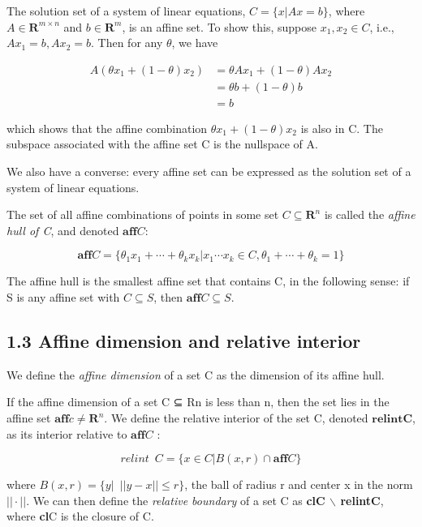 \documentclass{article}
\begin{document}
The solution set of a system of linear
equations, $C=\{x|Ax=b\}$, where $A\in \mathbf{R}^{m\times n}$ and $b \in\mathbf{R}^m$, is an affine set. To
show this, suppose $x_1, x_2\in C$, i.e.,$ Ax_1=b, Ax_2=b$. Then for any $\theta$, we have

\begin{equation*}
    \begin{split}
        A(\theta x_1 + (1-\theta)x_2)&= \theta Ax_1 + (1-\theta)Ax_2\\
        &=\theta b + (1-\theta)b\\
        &=b
    \end{split}
\end{equation*}

which shows that the affine combination $\theta x_1 + (1-\theta)x_2$ is also in C. The subspace
associated with the affine set C is the nullspace of A.

We also have a converse: every affine set can be expressed as the solution set of a
system of linear equations.

The set of all affine combinations of points in some set $C\subseteq \mathbf{R}^n$ is called the
\textit{affine hull of C}, and denoted $\mathbf{aff} C$:

\[
\mathbf{aff} C=\{\theta_1x_1+\cdots+\theta_kx_k|x_1\cdots x_k\in C,\theta_1+\cdots+\theta_k=1\}    
\]

The affine hull is the smallest affine set that contains C, in the following sense: if
S is any affine set with $C \subseteq S$, then $\mathbf{aff} C \subseteq S$.

\subsection*{1.3 Affine dimension and relative interior}

We define the \textit{affine dimension} of a set C as the dimension of its affine hull.

If the affine dimension of a set C ⊆ Rn is less than n, then the set lies in
the affine set $\mathbf{aff} c\ne \mathbf{R}^n$. We define the relative interior of the set C, denoted
$\mathbf{relintC}$, as its interior relative to $\mathbf{aff}C$ :

\[
relint\enspace C= \{x\in C|B(x,r)\cap \mathbf{aff} C\}   
\]

where $B(x,r)=\{y|\enspace||y-x||\le r\}$, the ball of radius r and center x in the norm $||\cdot||$. We can
then define the \textit{relative boundary} of a set C as \textbf{clC $\backslash$ relintC}, where \textbf{cl}C is the
closure of C.
\end{document}
